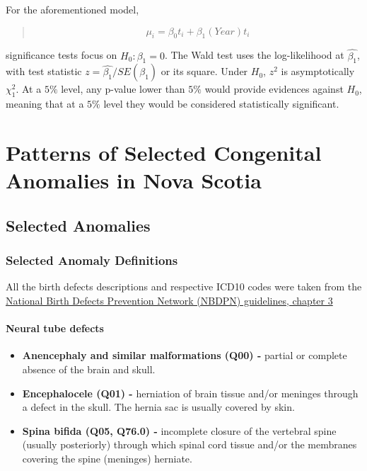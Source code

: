 \documentclass[
]{krantz}
\begin{document}
For the aforementioned model,

\begin{quote}
\[
\mu_{i} = \beta_{0}t_{i} + \beta_{1}(Year)t_{i}
\]
\end{quote}

significance tests focus on \(H_{0}: \beta_{1} =0\). The Wald test uses the log-likelihood at \(\hat{\beta_{1}}\), with test statistic \(z=\hat{\beta_{1}} / SE(\hat{\beta_{1}})\) or its square. Under \(H_{0}\), \(z^{2}\) is asymptotically \(\chi^{2}_{1}\). At a \(5\%\) level, any p-value lower than \(5\%\) would provide evidences against \(H_{0}\), meaning that at a \(5\%\) level they would be considered statistically significant.

\hypertarget{chapter-2}{%
\chapter{Patterns of Selected Congenital Anomalies in Nova Scotia}\label{chapter-2}}

\hypertarget{section-21}{%
\section{Selected Anomalies}\label{section-21}}

\hypertarget{section-211}{%
\subsection{Selected Anomaly Definitions}\label{section-211}}

All the birth defects descriptions and respective ICD10 codes were taken from the \href{https://www.nbdpn.org/docs/SGSC_-_Ch3_Case_Definition_-_final_draft_2016DEC20.pdf}{National Birth Defects Prevention Network (NBDPN) guidelines, chapter 3}

\hypertarget{section-2111}{%
\subsubsection{Neural tube defects}\label{section-2111}}

\begin{itemize}
\item
  \textbf{Anencephaly and similar malformations (Q00) -} partial or complete absence of the brain and skull.
\item
  \textbf{Encephalocele (Q01) -} herniation of brain tissue and/or meninges through a defect in the skull. The hernia sac is usually covered by skin.
\item
  \textbf{Spina bifida (Q05, Q76.0) -} incomplete closure of the vertebral spine (usually posteriorly) through which spinal cord tissue and/or the membranes covering the spine (meninges) herniate.
\end{itemize}
\end{document}
